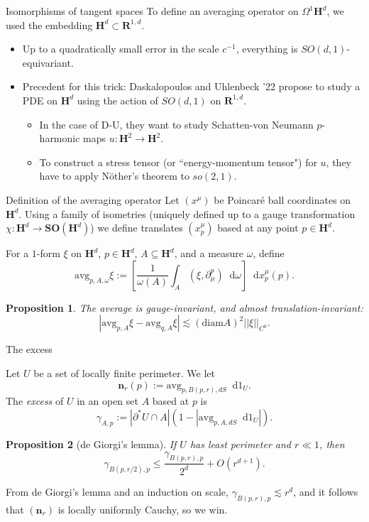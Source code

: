 \documentclass[10pt]{beamer}
\newcommand{\RR}{\mathbf{R}}
\newcommand{\Hyp}{\mathbf H}
\newcommand{\SpOrth}{\mathbf{SO}}
\newcommand*\dif{\mathop{}\!\mathrm{d}}
\newcommand{\dfn}[1]{\emph{#1}\index{#1}}
\newcommand{\avg}{\mathrm{avg}}
\newcommand{\normal}{\mathbf n}
\newtheorem{proposition}{Proposition}
\begin{document}
\begin{frame}{Isomorphisms of tangent spaces}
To define an averaging operator on $\Omega^1\Hyp^d$, we used the embedding $\Hyp^d \subset \RR^{1, d}$.
\begin{itemize}
\item Up to a quadratically small error in the scale $c^{-1}$, everything is $SO(d, 1)$-equivariant.
\item Precedent for this trick: Daskalopoulos and Uhlenbeck '22 propose to study a PDE on $\Hyp^d$ using the action of $SO(d, 1)$ on $\RR^{1, d}$.
\begin{itemize}
\item In the case of D-U, they want to study Schatten-von Neumann $p$-harmonic maps $u: \Hyp^2 \to \Hyp^2$.
\item To construct a stress tensor (or ``energy-momentum tensor") for $u$, they have to apply N\"other's theorem to $so(2, 1)$.
\end{itemize}
\end{itemize}
\end{frame}

\begin{frame}{Definition of the averaging operator}
Let $(x^\mu)$ be Poincar\'e ball coordinates on $\Hyp^d$.
Using a family of isometries (uniquely defined up to a gauge transformation $\chi: \Hyp^d \to \SpOrth(\Hyp^d)$) we define translates $(x^\mu_p)$ based at any point $p \in \Hyp^d$.

\begin{definition}
For a $1$-form $\xi$ on $\Hyp^d$, $p \in \Hyp^d$, $A \subseteq \Hyp^d$, and a measure $\omega$, define
$$\avg_{p, A, \omega} \xi := \left[\frac{1}{\omega(A)} \int_A (\xi, \partial_\mu^p) \dif \omega\right] \dif x^\mu_p(p).$$
\end{definition}

\begin{proposition}
The average is gauge-invariant, and almost translation-invariant:
$$|\avg_{p, A} \xi - \avg_{q, A} \xi| \lesssim (\mathrm{diam} A)^2 ||\xi||_{C^0}.$$
\end{proposition}
\end{frame}

\begin{frame}{The excess}
\begin{definition}
Let $U$ be a set of locally finite perimeter. We let
$$\normal_r(p) := \avg_{p, B(p, r), dS} \dif 1_U.$$
The \dfn{excess} of $U$ in an open set $A$ based at $p$ is
$$\gamma_{A, p} := |\partial^* U \cap A|\left(1 - \left|\avg_{p, A, dS} \dif 1_U\right|\right).$$
\end{definition}

\begin{proposition}[de Giorgi's lemma]
If $U$ has least perimeter and $r \ll 1$, then
$$\gamma_{B(p, r/2), p} \leq \frac{\gamma_{B(p, r), p}}{2^d} + O(r^{d + 1}).$$
\end{proposition}

From de Giorgi's lemma and an induction on scale, $\gamma_{B(p, r), p} \lesssim r^d$, and it follows that $(\normal_r)$ is locally uniformly Cauchy, so we win.
\end{frame}
\end{document}

